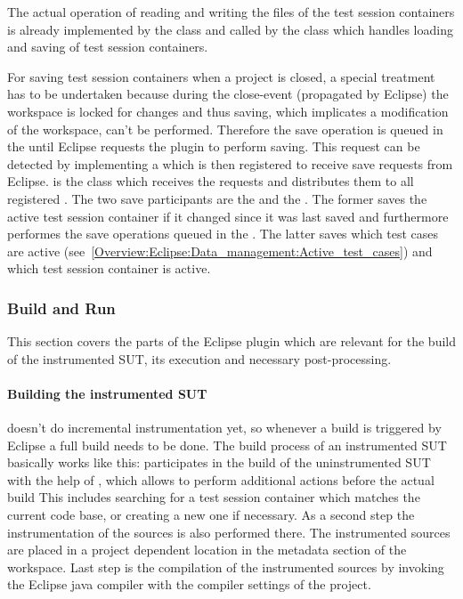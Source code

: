 The actual operation of reading and writing the files of the test session containers is already implemented by the class  and called by the class  which handles loading and saving of test session containers.

For saving test session containers when a project is closed, a special treatment has to be undertaken because during the close-event (propagated by Eclipse) the workspace is locked for changes and thus saving, which implicates a modification of the workspace, can't be performed. Therefore the save operation is queued in the  until Eclipse requests the plugin to perform saving. This request can be detected by implementing a  which is then registered to receive save requests from Eclipse.  is the class which receives the requests and distributes them to all registered . The two save participants are the  and the \linebreak{}. The former saves the active test session container if it changed since it was last saved and furthermore performes the save operations queued in the . The latter saves which test cases are active (see~\ref{Overview:Eclipse:Data_management:Active_test_cases}) and which test session container is active.

\subsubsection{Build and Run}

This section covers the parts of the Eclipse plugin which are relevant for
the build of the instrumented SUT, its execution and necessary post-processing.

\paragraph{Building the instrumented SUT}
\gbt doesn't do incremental instrumentation yet, so whenever a
build is triggered by Eclipse a full build needs to be done.
The build process of an instrumented SUT basically works like this:
\gbt participates in the build of the uninstrumented SUT
with the help of , which
allows \gbt to perform additional actions before the actual build
This includes searching for a test session container which 
matches the current code base, or creating a new one if necessary.
As a second step the instrumentation of the sources is also performed there. The
instrumented sources are placed in a project dependent location in the
metadata section of the workspace. Last step is the compilation of the
instrumented sources by invoking the Eclipse java compiler
with the compiler settings of the project.

